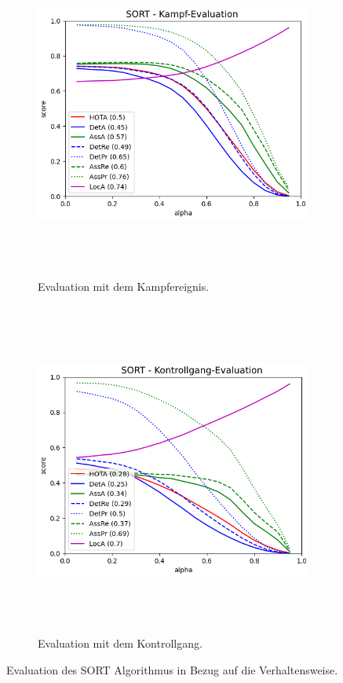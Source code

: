 \begin{figure}[htbp]
     \centering
     \begin{subfigure}[b]{0.9\textwidth}
         \centering
         \includegraphics[width=\textwidth, height=11cm]{img/Plots/MOT Evaluation/HOTA SORT Kampf.png}
         \caption{Evaluation mit dem Kampfereignis.}
     \end{subfigure}
     \hfill
     \begin{subfigure}[b]{0.9\textwidth}
         \centering
         \includegraphics[width=\textwidth, height=11cm]{img/Plots/MOT Evaluation/HOTA SORT Kontrollgang.png}
         \caption{Evaluation mit dem Kontrollgang.}
     \end{subfigure}
     \caption{Evaluation des SORT Algorithmus in Bezug auf die Verhaltensweise.}
     \label{fig:SORTHOTAEREIG}
\end{figure}

